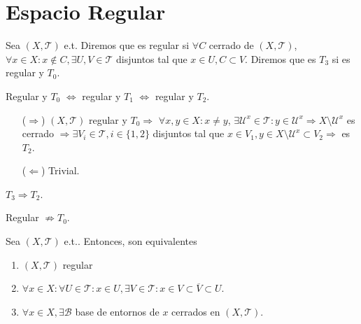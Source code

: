 \section{Espacio Regular}

\begin{defn}
  Sea $( X, \mathcal{T} )$ e.t. Diremos que es regular si $\forall C$ cerrado de $( X, \mathcal{T} )$, $\forall x \in X : x \not \in C, \exists U , V \in \mathcal{T}$ disjuntos tal que $x \in U, C \subset V$. Diremos que es $T_{3}$ si es regular y $T_{0}$.
\end{defn}

\begin{obs}
  Regular y $T_{0}$ $\Leftrightarrow $ regular y $ T_{1}$ $\Leftrightarrow$ regular y $T_{2}$.
\end{obs}

\begin{dem}
  \begin{enumerate}[label=(\roman*)]
    \item [($\Rightarrow$)] $( X, \mathcal{T} )$ regular y $T_{0} \Rightarrow$ $\forall x,y \in X : x \neq y$, $\exists \mathcal{U}^{x} \in \mathcal{T}: y \in \mathcal{U}^{x} \Rightarrow X \setminus \mathcal{U}^{x}$ es cerrado $\Rightarrow \exists V_{i} \in \mathcal{T}, i \in \{  1, 2 \}$ disjuntos tal que $x \in V_{1}, y \in X \setminus \mathcal{U}^{x} \subset V_{2} \Rightarrow$ es $T_{2}$.
    \item [($\Leftarrow$)] Trivial.
  \end{enumerate}
\end{dem}

\begin{obs}
  $T_{3} \Rightarrow T_{2}$.
\end{obs}

\begin{obs}
  Regular $\not \Rightarrow T_{0}$.
\end{obs}

\begin{prop}
  Sea $( X, \mathcal{T} )$ e.t.. Entonces, son equivalentes
  \begin{enumerate}[label=(\roman*)]
    \item $( X, \mathcal{T} )$ regular
    \item $\forall x \in X : \forall U \in \mathcal{T} : x \in U, \exists V \in \mathcal{T}: x \in V \subset \overline{V} \subset U$.
    \item $\forall x \in X, \exists \mathcal{B}$ base de entornos de $x$ cerrados en $( X, \mathcal{T} )$.
  \end{enumerate}
\end{prop}

